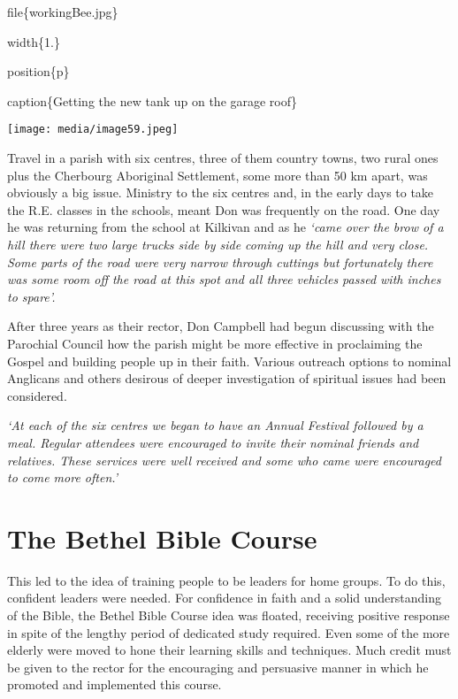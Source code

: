 file\{workingBee.jpg\}

width\{1.\}

position\{p\}

caption\{Getting the new tank up on the garage roof\}

\texttt{[image: media/image59.jpeg]}

Travel in a parish with six centres, three of them country towns, two rural ones plus the Cherbourg Aboriginal Settlement, some more than 50 km apart, was obviously a big issue. Ministry to the six centres and, in the early days to take the R.E. classes in the schools, meant Don was frequently on the road. One day he was returning from the school at Kilkivan and as he \emph{`came over the brow of a hill there were two large trucks side by side coming up the hill and very close. Some parts of the road were very narrow through cuttings but fortunately there was some room off the road at this spot and all three vehicles passed with inches to spare'.}

After three years as their rector, Don Campbell had begun discussing with the Parochial Council how the parish might be more effective in proclaiming the Gospel and building people up in their faith. Various outreach options to nominal Anglicans and others desirous of deeper investigation of spiritual issues had been considered.

\emph{`At each of the six centres we began to have an Annual Festival followed by a meal. Regular attendees were encouraged to invite their nominal friends and relatives. These services were well received and some who came were encouraged to come more often.'}

\hypertarget{the-bethel-bible-course}{%
\section{The Bethel Bible Course}\label{the-bethel-bible-course}}

This led to the idea of training people to be leaders for home groups. To do this, confident leaders were needed. For confidence in faith and a solid understanding of the Bible, the Bethel Bible Course idea was floated, receiving positive response in spite of the lengthy period of dedicated study required. Even some of the more elderly were moved to hone their learning skills and techniques. Much credit must be given to the rector for the encouraging and persuasive manner in which he promoted and implemented this course.

